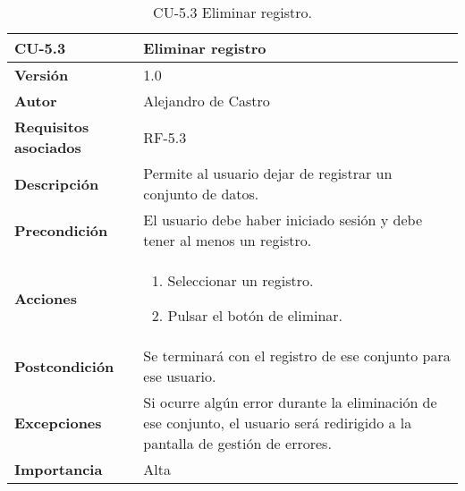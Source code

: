 \begin{table}[p]
	\centering
	\begin{tabularx}{\linewidth}{ p{} p{} }
		\toprule
		\textbf{CU-5.3}    & \textbf{Eliminar registro}\\
		\toprule
		\textbf{Versión}              & 1.0    \\
		\textbf{Autor}                & {Alejandro de Castro} \\
		\textbf{Requisitos asociados} & RF-5.3 \\
		\textbf{Descripción}          & Permite al usuario dejar de registrar un conjunto de datos. \\
		\textbf{Precondición}         & El usuario debe haber iniciado sesión y debe tener al menos un registro. \\
        \textbf{Acciones}             &
		\begin{enumerate}
			\def\labelenumi{\arabic{enumi}.}
			\tightlist
			\item Seleccionar un registro.
			\item Pulsar el botón de eliminar.
		\end{enumerate}\\ 
		\textbf{Postcondición}        & Se terminará con el registro de ese conjunto para ese usuario. \\
		\textbf{Excepciones}          & Si ocurre algún error durante la eliminación de ese conjunto, el usuario será redirigido a la pantalla de gestión de errores. \\
		\textbf{Importancia}          & Alta \\
		\bottomrule
	\end{tabularx}
	\caption{CU-5.3 Eliminar registro.}
\end{table}

